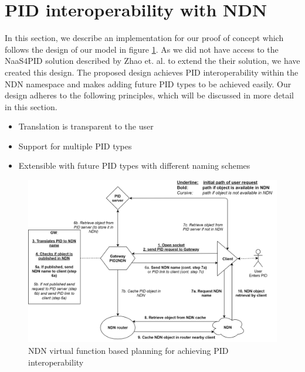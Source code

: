 \section{PID interoperability with NDN}\label{pid-poc}

In this section, we describe an implementation for our proof of concept which follows the design of our model in figure \ref{fig:sdc_model}. 
As we did not have access to the NaaS4PID solution described by Zhao et. al. to extend the their solution, we have created this design. The proposed design achieves PID interoperability within the NDN namespace and makes adding future PID types to be achieved easily. Our design adheres to the following principles, which will be discussed in more detail in this section.

\begin{itemize}
    \item{Translation is transparent to the user}
    \item{Support for multiple PID types}
    \item{Extensible with future PID types with different naming schemes}
\end{itemize}

\begin{figure}[H]
\centering
\includegraphics[width=\textwidth]{Images/PIDtoNDN10.png}
\caption{NDN virtual function based 
planning for achieving PID interoperability}
\label{fig:sdc_model}
\end{figure}

